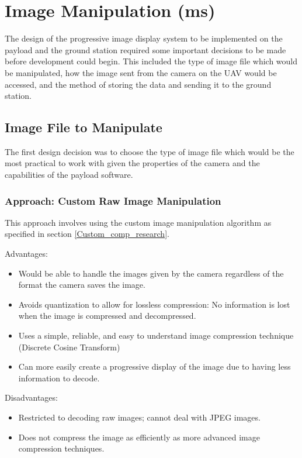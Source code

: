 \section{Image Manipulation (ms)}
\label{sec:progressiveimagedisplay}

The design of the progressive image
display system to be implemented on the
payload and the ground station required some
important decisions to be made before 
development could begin. This included
the type of image file which would be
manipulated, how the image sent from the camera on 
the UAV would be accessed,
and the method of storing the data
and sending it to the ground station.

\subsection{Image File to Manipulate}

The first design decision was to choose the type of image 
file which would be the most practical to work with given
the properties of the camera and the
capabilities of the payload software.

\subsubsection{Approach: Custom Raw Image Manipulation}

This approach involves using the custom image 
manipulation algorithm as specified 
in section \ref{Custom_comp_research}.

Advantages:
\begin{itemize}
	\item Would be able to handle the images
		given by the camera regardless of the format
		the camera saves the image.
	\item Avoids quantization to allow 
		for lossless compression: No information is
		lost when the image is 
		compressed and decompressed.
	\item Uses a simple, reliable, and easy to 
		understand image compression technique
		(Discrete Cosine Transform)
	\item Can more easily create a progressive
		display of the image due to having less
		information to decode.
\end{itemize}

Disadvantages:
\begin{itemize}
	\item Restricted to decoding raw images; 
		cannot deal with JPEG images.
	\item Does not compress the image as 
		efficiently as more advanced 
		image compression techniques.
\end{itemize}

